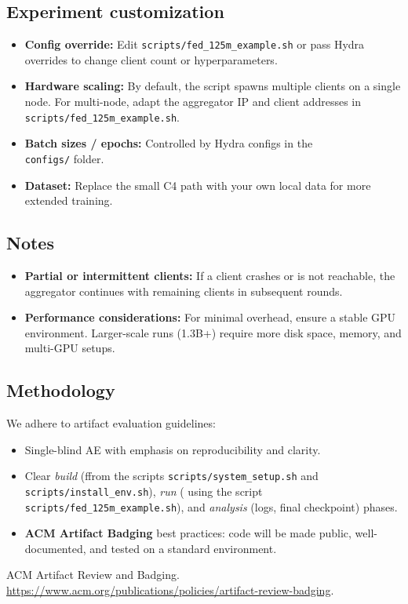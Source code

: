 \documentclass{sigplanconf}
\begin{document}
\subsection{Experiment customization}
\begin{itemize}
  \item \textbf{Config override:} Edit \texttt{scripts/fed\_125m\_example.sh} or pass Hydra overrides to change client count or hyperparameters.
  \item \textbf{Hardware scaling:} By default, the script spawns multiple clients on a single node. For multi-node, adapt the aggregator IP and client addresses in \texttt{scripts/fed\_125m\_example.sh}.
  \item \textbf{Batch sizes / epochs:} Controlled by Hydra configs in the\\ \texttt{configs/} folder.
  \item \textbf{Dataset:} Replace the small C4 path with your own local data for more extended training.
\end{itemize}

\subsection{Notes}
\begin{itemize}
  \item \textbf{Partial or intermittent clients:} If a client crashes or is not reachable, the aggregator  continues with remaining clients in subsequent rounds.
  \item \textbf{Performance considerations:} For minimal overhead, ensure a stable GPU environment. Larger-scale runs (1.3B+) require more disk space, memory, and  multi-GPU setups.
\end{itemize}

\subsection{Methodology}
\noindent
We adhere to artifact evaluation guidelines:
\begin{itemize}
  \item Single-blind AE with emphasis on reproducibility and clarity.
  \item Clear \textit{build} (ffrom the scripts \texttt{scripts/system\_setup.sh} and\\ \texttt{scripts/install\_env.sh}), \textit{run} ( using the script\\ \texttt{scripts/fed\_125m\_example.sh}), and \textit{analysis} (logs, final checkpoint) phases.
  \item \textbf{ACM Artifact Badging} \cite{acm-badging} best practices: code will be made public, well-documented, and tested on a standard environment.
\end{itemize}

\begin{thebibliography}{9}

ACM Artifact Review and Badging.
\newblock \url{https://www.acm.org/publications/policies/artifact-review-badging}.

\end{thebibliography}
\end{document}
